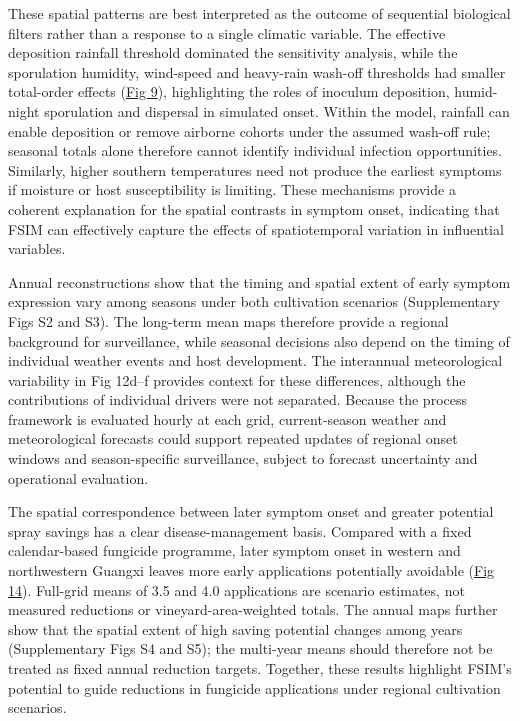 \documentclass{article}
\begin{document}
These spatial patterns are best interpreted as the outcome of sequential
biological filters rather than a response to a single climatic variable. The
effective deposition rainfall threshold dominated the sensitivity analysis,
while the sporulation humidity, wind-speed and heavy-rain wash-off
thresholds had smaller total-order effects (\hyperref[_Ref222510092]{Fig
9}), highlighting the roles of inoculum deposition, humid-night sporulation
and dispersal in simulated onset. Within the model, rainfall can enable
deposition or remove airborne cohorts under the assumed wash-off rule;
seasonal totals alone therefore cannot identify individual infection
opportunities. Similarly, higher southern temperatures need not produce the
earliest symptoms if moisture or host susceptibility is limiting. These
mechanisms provide a coherent explanation for the spatial contrasts in
symptom onset, indicating that FSIM can effectively capture the effects of
spatiotemporal variation in influential variables.

Annual reconstructions show that the timing and spatial extent of early
symptom expression vary among seasons under both cultivation scenarios
(Supplementary Figs S2 and S3). The long-term mean maps therefore provide a
regional background for surveillance, while seasonal decisions also depend
on the timing of individual weather events and host development. The
interannual meteorological variability in Fig 12d--f provides context for
these differences, although the contributions of individual drivers were not
separated. Because the process framework is evaluated hourly at each grid,
current-season weather and meteorological forecasts could support repeated
updates of regional onset windows and season-specific surveillance, subject
to forecast uncertainty and operational evaluation.

The spatial correspondence between later symptom onset and greater potential
spray savings has a clear disease-management basis. Compared with a fixed
calendar-based fungicide programme, later symptom onset in western and
northwestern Guangxi leaves more early applications potentially avoidable
(\hyperref[_Ref223012659]{Fig 14}). Full-grid means of 3.5 and 4.0
applications are scenario estimates, not measured reductions or
vineyard-area-weighted totals. The annual maps further show that the spatial
extent of high saving potential changes among years (Supplementary Figs S4
and S5); the multi-year means should therefore not be treated as fixed
annual reduction targets. Together, these results highlight FSIM's potential
to guide reductions in fungicide applications under regional cultivation
scenarios.
\end{document}
